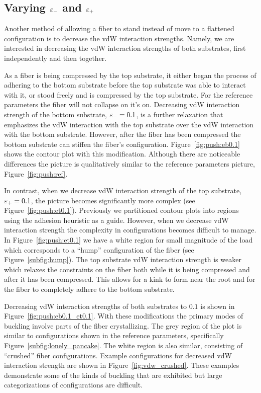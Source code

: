 {\subsection{Varying $\varepsilon_-$ and $\varepsilon_+$} \label{subsection:push:eps}

Another method of allowing a fiber to stand instead of move to a flattened configuration is to decrease the vdW interaction strengths. Namely, we are interested in decreasing the vdW interaction strengths of both substrates, first independently and then together.

As a fiber is being compressed by the top substrate, it either began the process of adhering to the bottom substrate before the top substrate was able to interact with it, or stood freely and is compressed by the top substrate. For the reference parameters the fiber will not collapse on it's on. Decreasing vdW interaction strength of the bottom substrate, $\varepsilon_-=0.1$, is a further relaxation that emphasizes the vdW interaction with the top substrate over the vdW interaction with the bottom substrate. However, after the fiber has been compressed the bottom substrate can stiffen the fiber's configuration. Figure~\ref{fig:push:eb0.1} shows the contour plot with this modification. Although there are noticeable differences the picture is qualitatively similar to the reference parameters picture, Figure~\ref{fig:push:ref}.

In contrast, when we decrease vdW interaction strength of the top substrate, $\varepsilon_+=0.1$, the picture becomes significantly more complex (see Figure~\ref{fig:push:et0.1}). Previously we partitioned contour plots into regions using the adhesion heuristic as a guide. However, when we decrease vdW interaction strength the complexity in configurations becomes difficult to manage. In Figure~\ref{fig:push:et0.1} we have a white region for small magnitude of the load which corresponds to a ``hump'' configuration of the fiber (see Figure~\ref{subfig:hump}). The top substrate vdW interaction strength is weaker which relaxes the constraints on the fiber both while it is being compressed and after it has been compressed. This allows for a kink to form near the root and for the fiber to completely adhere to the bottom substrate.

Decreasing vdW interaction strengths of both substrates to $0.1$ is shown in Figure~\ref{fig:push:eb0.1_et0.1}. With these modifications the primary modes of buckling involve parts of the fiber crystallizing. The grey region of the plot is similar to configurations shown in the reference parameters, specifically Figure~\ref{subfig:lonely_pancake}. The white region is also similar, consisting of ``crushed'' fiber configurations. Example configurations for decreased vdW interaction strength are shown in Figure~\ref{fig:vdw_crushed}. These examples demonstrate some of the kinds of buckling that are exhibited but large categorizations of configurations are difficult.
	
}
